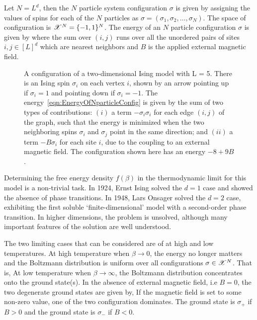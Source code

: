 \documentclass[letterpaper,english,10pt]{article}
\begin{document}
Let $N = L^d$, then the $N$ particle system configuration $\sigma$ is given by assigning the values of spins  for each of the $N$ particles as $\sigma = (\sigma_1, \sigma_2, \dots, \sigma_N)$. 
The space of configuration is $\mathscr{X}^N = \{-1,1\}^N$. 
The energy of an $N$ particle configuration $\sigma$ is given by
where the sum over $(i,j)$ runs over all the unordered pairs of sites $i,j \in [L]^d$ which are nearest neighbors and $B$ is the applied external magnetic field. 

\begin{figure}
\centering

\caption{A configuration of a two-dimensional Ising model with L = 5. There is an Ising spin $\sigma_i$ on each vertex $i$, shown by an arrow pointing up if $\sigma_i = 1$ and pointing down if $\sigma_i = -1$.
The energy~\eqref{eqn:EnergyOfNparticleConfig}  is given by the sum of two types of contributions: 
$(i)$ a term $-\sigma_i\sigma_i$ for each edge $(i, j)$ of the graph, such that the energy is minimized when the two neighboring spins $\sigma_i$ and $\sigma_j$ point in the same direction; 
and $(ii)$ a term $-B\sigma_i$ for each site $i$, due to the coupling to an external magnetic field. 
The configuration shown here has an energy $-8+9B$.}
\label{figure:IsingSpins}
\end{figure}

Determining the free energy density $f(\beta)$ in the thermodynamic limit for this model is a non-trivial task. In 1924, Ernst Ising solved the $d=1$ case and showed the absence of phase transitions. 
In 1948, Lars Onsager solved the $d=2$ case, exhibiting the first soluble `finite-dimensional' model with a second-order phase transition. 
In higher dimensions, the problem is unsolved, although many important features of the solution are well understood.

The two limiting cases that can be considered are of at high and low temperatures. 
At high temperature when $\beta \to 0$, the energy no longer matters and the Boltzmann distribution is uniform over all configurations $\sigma \in \mathscr{X}^N$. 
That is, 
At low temperature when $\beta \to \infty$, 
the Boltzmann distribution concentrates onto the ground state(s). 
In the absence of external magnetic field, i.e $B=0$, the two degenerate ground states are given by,
If the magnetic field is set to some non-zero value, one of the two configuration dominates. 
The ground state is $\sigma_+$ if $B>0$ and the ground state is $\sigma_-$ if $B<0$.
\end{document}
